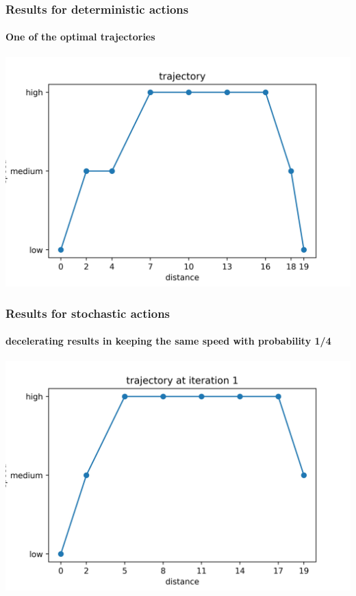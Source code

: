 \documentclass[dvipsnames,svgnames]{beamer}
\begin{document}
\begin{frame}
\frametitle{Results for deterministic actions}
\framesubtitle{One of the optimal trajectories}
\centering
\includegraphics[scale=0.5]{img/trajectory.jpg}
\end{frame}

\begin{frame}
\frametitle{Results for stochastic actions}
\framesubtitle{decelerating  results in keeping the same speed with probability 1/4}
\centering
\includegraphics[scale=0.5]{img/trajectory1.jpg}
\end{frame}
\end{document}
